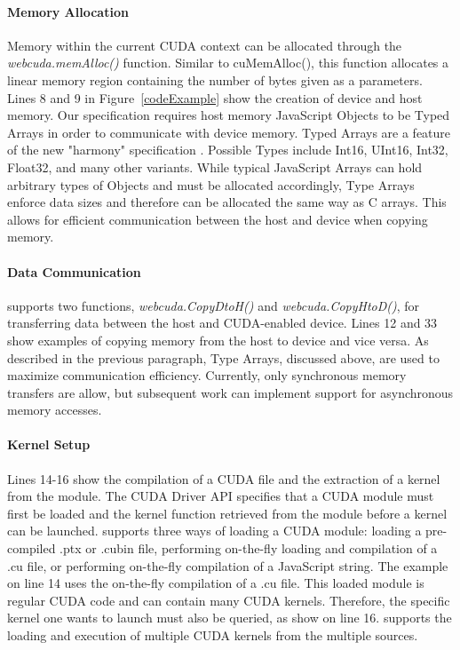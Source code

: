 \paragraph{Memory Allocation} Memory within the current CUDA context can be
allocated through the \textit{webcuda.memAlloc()} function. Similar to
cuMemAlloc(), this function allocates a linear memory region containing the
number of bytes given as a parameters. Lines 8 and 9 in Figure~\ref{codeExample}
show the creation of device and host memory.  Our specification requires host
memory JavaScript Objects to be Typed Arrays \cite{typedarray} in order to communicate
with device memory. Typed Arrays are a feature of the new "harmony"
specification \cite{harmony}. Possible Types include Int16, UInt16, Int32, Float32, and many
other variants. While typical JavaScript Arrays can hold arbitrary types of Objects and must be
allocated accordingly, Type Arrays enforce data sizes and therefore can be
allocated the same way as C arrays. This allows for efficient communication
between the host and device when copying memory.


\paragraph{Data Communication} \name supports two functions,
\textit{webcuda.CopyDtoH()} and \textit{webcuda.CopyHtoD()}, for transferring
data between the host and CUDA-enabled device. Lines 12 and 33 show examples of
copying memory from the host to device and vice versa. As described in the
previous paragraph, Type Arrays, discussed above, are used to maximize
communication efficiency. Currently, only synchronous memory transfers are
allow, but subsequent work can implement support for asynchronous memory
accesses.

\paragraph{Kernel Setup}
Lines 14-16 show the compilation of a CUDA file and the extraction of a kernel
from the module. The CUDA Driver API specifies that a CUDA module must first be
loaded and the kernel function retrieved from the module before a kernel can be
launched. \name supports three ways of loading a CUDA module: loading a
pre-compiled .ptx or .cubin file, performing on-the-fly loading and compilation
of a .cu file, or performing on-the-fly compilation of a JavaScript string. 
The example on line 14 uses the on-the-fly compilation of a .cu
file. This loaded module is regular CUDA code and can contain many CUDA kernels.
Therefore, the specific kernel one wants to launch must also be queried, as show
on line 16. \name supports the loading and execution of multiple CUDA kernels
from the multiple sources.

